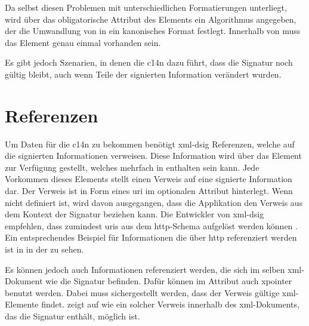 Da  selbst diesen Problemen mit unterschiedlichen Formatierungen unterliegt, wird über das obligatorische Attribut
 des Elements  ein Algorithmus angegeben, der
die Umwandlung von  in ein kanonisches Format festlegt. Innerhalb von  muss das Element 
genau einmal vorhanden sein.

Es gibt jedoch Szenarien, in denen die \gls{c14n} dazu führt, dass die Signatur noch gültig bleibt, auch wenn Teile der signierten Information verändert wurden.
\todo

\section{Referenzen}
\label{sec:XML-DSig:Referenzen}
Um Daten für die \gls{c14n} zu bekommen benötigt \gls{xml-dsig} Referenzen, welche auf die signierten Informationen verweisen. Diese Information wird über das 
Element  zur Verfügung gestellt, welches mehrfach in  enthalten sein kann. Jede Vorkommen dieses Elements stellt einen Verweis auf eine
signierte Information dar. Der Verweis ist in Form eines \gls{uri} im optionalen Attribut  hinterlegt. Wenn 
nicht definiert ist, wird davon ausgegangen, dass die Applikation den Verweis aus dem Kontext der Signatur beziehen kann. Die Entwickler von \gls{xml-dsig}
empfehlen, dass zumindest \glspl{uri} aus dem \gls{http}-Schema aufgelöst werden können \cite{xml-dsig:w3c}. Ein entsprechendes Beispiel für Informationen die
über \gls{http} referenziert werden ist in  in der  zu sehen.



Es können jedoch auch Informationen referenziert werden, die sich im selben \gls{xml}-Dokument wie die Signatur befinden. Dafür können im Attribut
 auch \gls{xpointer} benutzt werden. Dabei muss sichergestellt werden, dass der Verweis gültige \gls{xml}-Elemente findet.
 zeigt auf  wie ein solcher Verweis innerhalb des \gls{xml}-Dokuments,
das die Signatur enthält, möglich ist.

